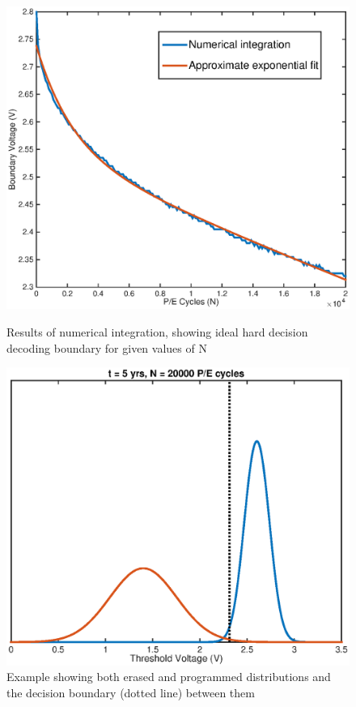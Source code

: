 \documentclass[11pt]{article}
\numberwithin{equation}{subsection}
\begin{document}
\begin{figure}[h]
\centering
{}
\centering
\includegraphics[scale=0.52]{variable_boundary_graph}
\caption{Results of numerical integration, showing ideal hard decision decoding boundary for given values of N}
\label{fig:hard_decision_variable_boundary}
\endminipage\hfill
{}
\centering
\includegraphics[scale=0.6]{variable_boundary_example}
\caption{Example showing both erased and programmed distributions and the decision boundary (dotted line) between them}
\label{fig:hard_decision_variable_example}
\endminipage
\end{figure}
\end{document}
